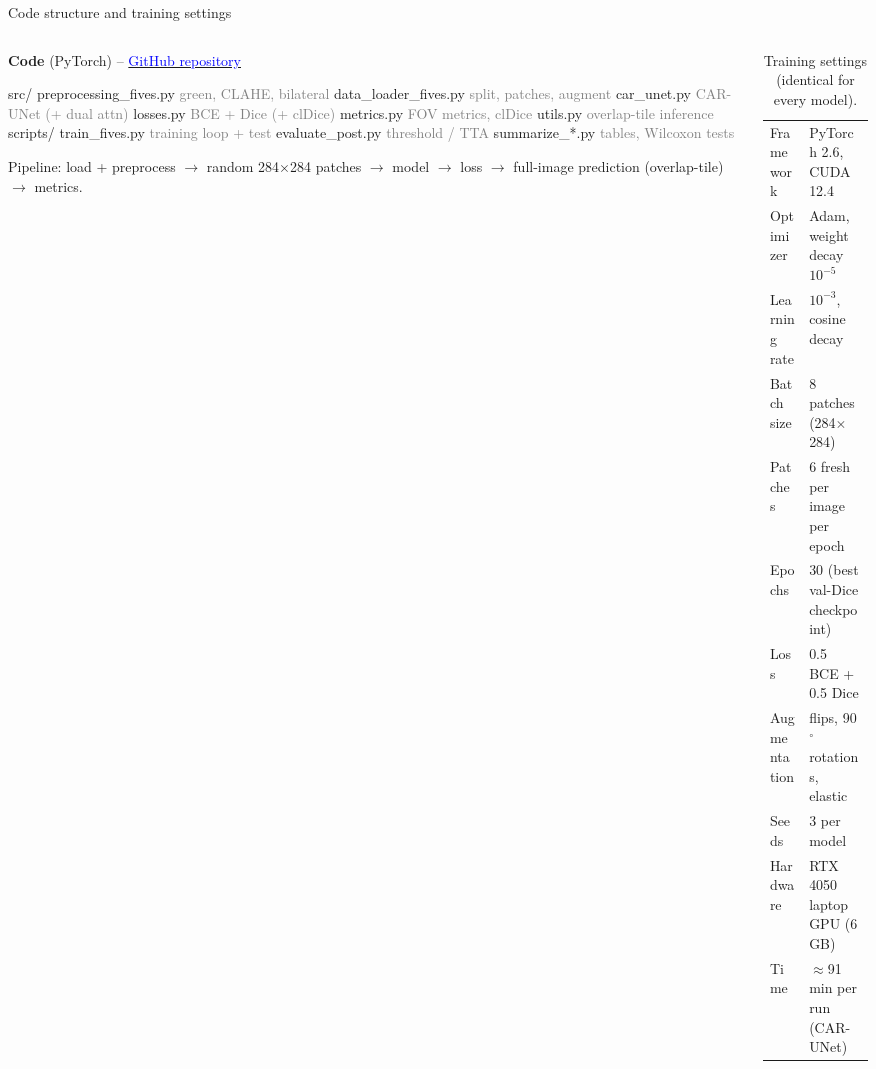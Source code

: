 \documentclass[aspectratio=169,10pt]{beamer}
\begin{document}
\begin{frame}[fragile]{Code structure and training settings}
  \begin{columns}[T]
    \begin{column}{0.5\textwidth}
      \textbf{Code} (PyTorch) -- \href{https://github.com/Abhishek-karthik/Retinal-Vessel-Segmentation-CAR-UNet}{\textcolor{blue}{GitHub repository}}
\begin{semiverbatim}\footnotesize
src/
 preprocessing_fives.py  \textcolor{gray}{green, CLAHE, bilateral}
 data_loader_fives.py    \textcolor{gray}{split, patches, augment}
 car_unet.py             \textcolor{gray}{CAR-UNet (+ dual attn)}
 losses.py               \textcolor{gray}{BCE + Dice (+ clDice)}
 metrics.py              \textcolor{gray}{FOV metrics, clDice}
 utils.py                \textcolor{gray}{overlap-tile inference}
scripts/
 train_fives.py          \textcolor{gray}{training loop + test}
 evaluate_post.py        \textcolor{gray}{threshold / TTA}
 summarize_*.py          \textcolor{gray}{tables, Wilcoxon tests}
\end{semiverbatim}
      \footnotesize Pipeline: load + preprocess $\rightarrow$ random 284$\times$284 patches $\rightarrow$ model $\rightarrow$ loss $\rightarrow$ full-image prediction (overlap-tile) $\rightarrow$ metrics.
    \end{column}
    \begin{column}{0.48\textwidth}
      \begin{table}
        \caption{Training settings (identical for every model).}
        \footnotesize
        \begin{tabular}{@{}ll@{}}
          \toprule
          Framework & PyTorch 2.6, CUDA 12.4 \\
          Optimizer & Adam, weight decay $10^{-5}$ \\
          Learning rate & $10^{-3}$, cosine decay \\
          Batch size & 8 patches (284$\times$284) \\
          Patches & 6 fresh per image per epoch \\
          Epochs & 30 (best val-Dice checkpoint) \\
          Loss & 0.5 BCE + 0.5 Dice \\
          Augmentation & flips, 90$^\circ$ rotations, elastic \\
          Seeds & 3 per model \\
          Hardware & RTX 4050 laptop GPU (6 GB) \\
          Time & $\approx$91 min per run (CAR-UNet) \\
          \bottomrule
        \end{tabular}
      \end{table}
    \end{column}
  \end{columns}
\end{frame}
\end{document}
